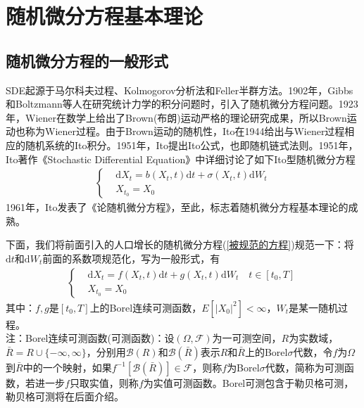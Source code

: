 \section{随机微分方程基本理论}
    \label{sec:随机微分方程基本理论}
    \subsection{随机微分方程的一般形式}
        \label{subsec:随机微分方程的一般形式}
        \par
        SDE起源于马尔科夫过程、Kolmogorov分析法和Feller半群方法。1902年，Gibbs和Boltzmann等人在研究统计力学的积分问题时，引入了随机微分方程问题。1923年，Wiener在数学上给出了Brown(布朗)运动严格的理论研究成果，所以Brown运动也称为Wiener过程。由于Brown运动的随机性，Ito在1944给出与Wiener过程相应的随机系统的Ito积分。1951年，Ito提出Ito公式，也即随机链式法则。1951年，Ito著作《Stochastic Differential Equation》中详细讨论了如下Ito型随机微分方程
        \begin{align*}
            \left\{
                \begin{aligned}
                        &\mathrm{d}X_t = b(X_t,t)\mathrm{d}t + \sigma (X_t,t)\mathrm{d}W_t\\
                        &X_{t_0} = X_0
                \end{aligned}
            \right.
        \end{align*}
        1961年，Ito发表了《论随机微分方程》，至此，标志着随机微分方程基本理论的成熟。
        \par
        下面，我们将前面引入的人口增长的随机微分方程(\ref{被规范的方程})规范一下：将$\mathrm{d}t$和$\mathrm{d}W_t$前面的系数项规范化，写为一般形式，有
        \begin{align}
            \label{规范的方程}
            \left\{
                \begin{aligned}
                        &\mathrm{d}X_t = f(X_t,t)\mathrm{d}t + g(X_t,t)\mathrm{d}W_t \quad t\in [t_0,T]\\
                        &X_{t_0} = X_0
                \end{aligned}
            \right.
        \end{align}
        其中：$f,g$是$[t_0,T]$上的Borel连续可测函数，$E[|X_0|^2] < \infty$，$W_t$是某一随机过程。\\
        注：Borel连续可测函数(可测函数)：设$(\Omega,\mathcal{F})$为一可测空间，$R$为实数域，$\bar{R} = R \cup \{-\infty,\infty\}$，分别用$\mathscr{B}(R)$和$\mathscr{B}(\bar{R})$表示$R$和$\bar{R}$上的Borel$\sigma$代数，令$f$为$\Omega$到$\bar{R}$中的一个映射，如果$f^{-1}[\mathscr{B}(\bar{R})] \in \mathcal{F}$，则称$f$为Borel$\sigma$代数，简称为可测函数，若进一步$f$只取实值，则称$f$为实值可测函数。Borel可测包含于勒贝格可测，勒贝格可测将在后面介绍。
